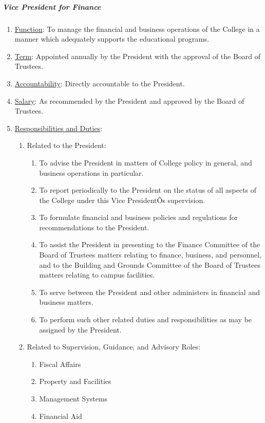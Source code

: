 \documentclass[letterpaper, 11pt]{article}
\begin{document}
				\subparagraph{Vice President for Finance}
					\begin{enumerate}[label=\alph*)]
						\item{\underline{Function}: To manage the financial and business operations of the College in a manner which adequately supports the educational programs.}
						\item{\underline{Term}: Appointed annually by the President with the approval of the Board of Trustees.}
						\item{\underline{Accountability}: Directly accountable to the President.}
						\item{\underline{Salary}: As recommended by the President and approved by the Board of Trustees.}
						\item{\underline{Responsibilities and Duties}:
							\begin{enumerate}[label=\arabic*)]
								\item{Related to the President:
									\begin{enumerate}[label=(\alph*)]
										\item{To advise the President in matters of College policy in general, and business operations in particular.}
										\item{To report periodically to the President on the status of all aspects of the College under this Vice PresidentÕs supervision.}
										\item{To formulate financial and business policies and regulations for recommendations to the President.}
										\item{To assist the President in presenting to the Finance Committee of the Board of Trustees matters relating to finance, business, and personnel, and to the Building and Grounds Committee of the Board of Trustees matters relating to campus facilities.}
										\item{To serve between the President and other administers in financial and business matters.}
										\item{To perform such other related duties and responsibilities as may be assigned by the President.}
									\end{enumerate}
								}
								\item{Related to Supervision, Guidance, and Advisory Roles:
									\begin{enumerate}[label=(\alph*)]
										\item{Fiscal Affairs}
										\item{Property and Facilities}
										\item{Management Systems}
										\item{Financial Aid}
									\end{enumerate}
								}
							\end{enumerate}
						}
					\end{enumerate}
\end{document}

